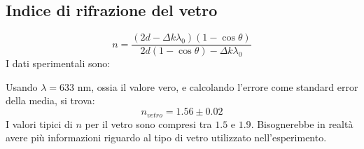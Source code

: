 \subsection{Indice di rifrazione del vetro}
%
$$ n = \frac{ (2d -\Delta k \lambda_0)(1-\cos\theta) }{ 2d (1-\cos\theta) - \Delta k \lambda_0}$$
%
I dati sperimentali sono:
%

%
Usando $\lambda = 633$ nm, ossia il valore vero, e calcolando l'errore come standard error della media, si trova:
$$ n_{vetro} = 1.56 \pm 0.02$$
I valori tipici di $n$ per il vetro sono compresi tra $1.5$ e $1.9$. Bisognerebbe in realtà avere più informazioni riguardo al tipo di vetro utilizzato nell'esperimento.



